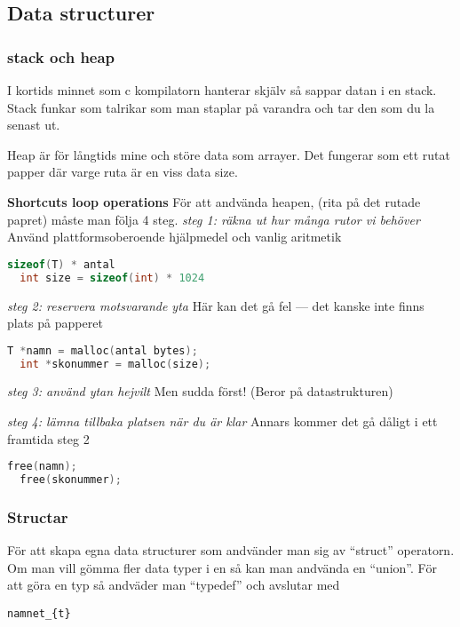 \subsection{Data structurer}
\subsubsection{stack och heap}
I kortids minnet som c kompilatorn hanterar skjälv så sappar datan i en stack.
Stack funkar som talrikar som man staplar på varandra och tar den som du la senast ut.

Heap är för långtids mine och störe data som arrayer.
Det fungerar som ett rutat papper där varge ruta är en viss data size.

\noindent\textbf{Shortcuts loop operations}
För att andvända heapen, (rita på det rutade papret) måste man följa 4 steg.
\noindent\emph{ steg 1: räkna ut hur många rutor vi behöver} \newline
Använd plattformsoberoende hjälpmedel och vanlig aritmetik
\begin{lstlisting}[language=C]
  sizeof(T) * antal
  int size = sizeof(int) * 1024
\end{lstlisting}

\noindent\emph{ steg 2: reservera motsvarande yta} \newline
Här kan det gå fel — det kanske inte finns plats på papperet
\begin{lstlisting}[language=C]
  T *namn = malloc(antal bytes); 
  int *skonummer = malloc(size);
\end{lstlisting}

\noindent\emph{ steg 3: använd ytan hejvilt} \newline
Men sudda först!
(Beror på datastrukturen)

\noindent\emph{ steg 4: lämna tillbaka platsen när du är klar} \newline
Annars kommer det gå dåligt i ett framtida steg 2
\begin{lstlisting}[language=C]
  free(namn); 
  free(skonummer);
\end{lstlisting}


\subsubsection{Structar}
För att skapa egna data structurer som andvänder man sig av ``struct'' operatorn.
Om man vill gömma fler data typer i en så kan man andvända en ``union''.
För att göra en typ så andväder man ``typedef'' och avslutar med \begin{verbatim}namnet_{t}\end{verbatim}

